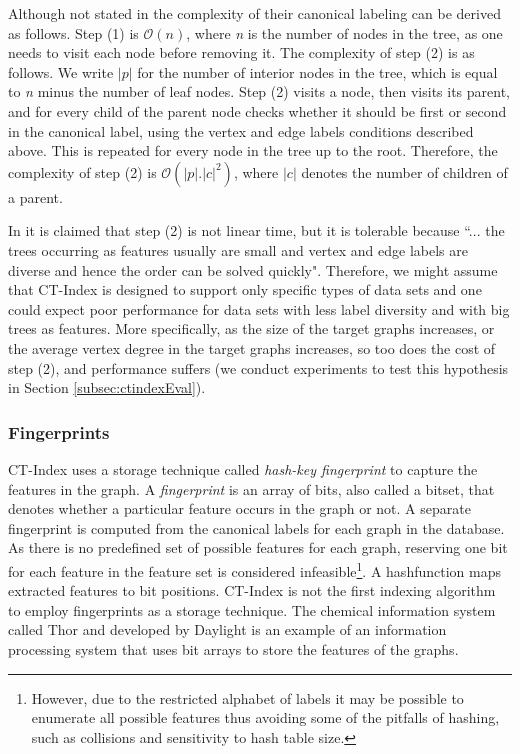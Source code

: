 \documentclass{l4proj}
\newcounter{example}[section]
\begin{document}
Although not stated in \cite{ctindex} the complexity of their canonical labeling can be derived as follows. Step (1) is $\mathcal{O}(n)$, where \emph{n} is the number of nodes in the tree, as one needs to visit each node before removing it. The complexity of step (2) is as follows. We write $|p|$ for the number of interior nodes in the tree, which is equal to \emph{n} minus the number of leaf nodes. Step (2) visits a node, then visits its parent, and for every child of the parent node checks whether it should be first or second in the canonical label, using the vertex and edge labels conditions described above. This is repeated for every node in the tree up to the root. Therefore, the complexity of step (2) is $\mathcal{O}(|p|.|c|^{2})$, where $|c|$ denotes the number of children of a parent.

In \cite{ctindex} it is claimed that step (2) is not linear time, but it is tolerable because ``... the trees occurring as features usually are small and vertex and edge labels are diverse and hence the order can be solved quickly". Therefore, we might assume that CT-Index is designed to support only specific types of data sets and one could expect poor performance for data sets with less label diversity and with big trees as features. More specifically, as the size of the target graphs increases, or the average vertex degree in the target graphs increases, so too does the cost of step (2), and performance suffers (we conduct experiments to test this hypothesis in Section \ref{subsec:ctindexEval}).

\subsubsection{Fingerprints}

CT-Index uses a storage technique called \emph{hash-key fingerprint} to capture the features in the graph. A \emph{fingerprint} is an array of bits, also called a bitset, that denotes whether a particular feature occurs in the graph or not. A separate fingerprint is computed from the canonical labels for each graph in the database. As there is no predefined set of possible features for each graph, reserving one bit for each feature in the feature set is considered infeasible\footnote{However, due to the restricted alphabet of labels it may be possible to enumerate all possible features thus avoiding some of the pitfalls of hashing, such as collisions and sensitivity to hash table size.}. A \gls{hashfunction} maps extracted features to bit positions.
CT-Index is not the first indexing algorithm to employ fingerprints as a storage technique. The chemical information system called Thor and developed by Daylight \cite{fingerprints} is an example of an information processing system that uses bit arrays to store the features of the graphs.
\end{document}
